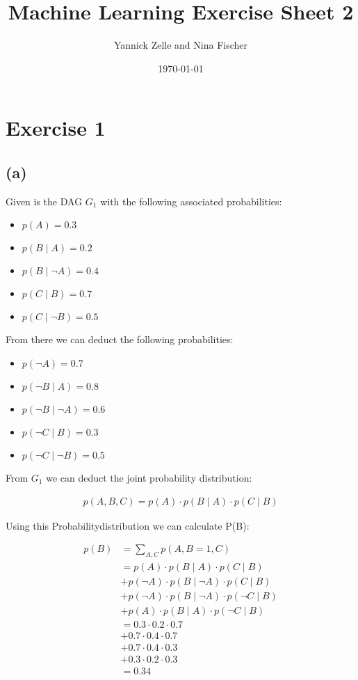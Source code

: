 \documentclass{article}
\title{Machine Learning Exercise Sheet 2}
\author{Yannick Zelle and Nina Fischer}
\date\today
\begin{document}
\maketitle %
\section*{Exercise 1}
\subsection*{(a)}
Given is the DAG $G_1$ with the following associated probabilities:
\begin{itemize}
    \item $p(A)=0.3$
    \item $p(B \mid A)=0.2$
    \item $p(B \mid \neg A)=0.4$
    \item $p(C \mid B)=0.7$
    \item $p(C \mid \neg B)=0.5$
\end{itemize}

From there we can deduct the following probabilities:

\begin{itemize}
    \item $p(\neg A)=0.7$
    \item $p(\neg B \mid A)=0.8$
    \item $p(\neg B \mid \neg A)=0.6$
    \item $p(\neg C \mid B)=0.3$
    \item $p(\neg C \mid \neg B)=0.5$
\end{itemize}

From $G_1$ we can deduct the joint probability distribution:

\begin{align*}
    p(A,B,C)=p(A) \cdot p(B \mid A) \cdot p(C \mid B)
\end{align*}

Using this Probabilitydistribution we can calculate P(B):

\begin{align*}
    p(B)    &= \sum_{A,C}^{} p(A,B=1,C) \\
            &= p(A) \cdot p(B \mid A) \cdot p(C \mid B) \\
            &+ p(\neg A) \cdot p(B \mid \neg A) \cdot p(C \mid B) \\
            &+ p(\neg A) \cdot p(B \mid \neg A) \cdot p(\neg C \mid B) \\
            &+ p( A) \cdot p(B \mid  A) \cdot p(\neg C \mid B) \\
            &= 0.3 \cdot 0.2 \cdot 0.7 \\
            &+ 0.7 \cdot 0.4 \cdot 0.7 \\
            &+ 0.7 \cdot 0.4 \cdot 0.3 \\
            &+ 0.3\cdot 0.2 \cdot 0.3 \\
            &= 0.34
\end{align*}
\end{document}
